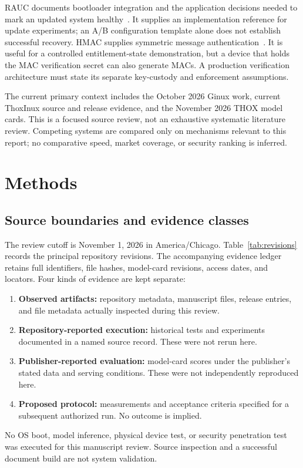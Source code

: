 \documentclass[11pt,a4paper]{article}
\begin{document}
RAUC documents bootloader integration and the application decisions needed to mark an updated system healthy~\cite{rauc}. It supplies an implementation reference for update experiments; an A/B configuration template alone does not establish successful recovery. HMAC supplies symmetric message authentication~\cite{hmac}. It is useful for a controlled entitlement-state demonstration, but a device that holds the MAC verification secret can also generate MACs. A production verification architecture must state its separate key-custody and enforcement assumptions.

The current primary context includes the October 2026 Ginux work, current ThoxInux source and release evidence, and the November 2026 THOX model cards. This is a focused source review, not an exhaustive systematic literature review. Competing systems are compared only on mechanisms relevant to this report; no comparative speed, market coverage, or security ranking is inferred.

\section{Methods}
\subsection{Source boundaries and evidence classes}
The review cutoff is November 1, 2026 in America/Chicago. Table~\ref{tab:revisions} records the principal repository revisions. The accompanying evidence ledger retains full identifiers, file hashes, model-card revisions, access dates, and locators. Four kinds of evidence are kept separate:
\begin{enumerate}
\item \textbf{Observed artifacts:} repository metadata, manuscript files, release entries, and file metadata actually inspected during this review.
\item \textbf{Repository-reported execution:} historical tests and experiments documented in a named source record. These were not rerun here.
\item \textbf{Publisher-reported evaluation:} model-card scores under the publisher's stated data and serving conditions. These were not independently reproduced here.
\item \textbf{Proposed protocol:} measurements and acceptance criteria specified for a subsequent authorized run. No outcome is implied.
\end{enumerate}
No OS boot, model inference, physical device test, or security penetration test was executed for this manuscript review. Source inspection and a successful document build are not system validation.
\end{document}
